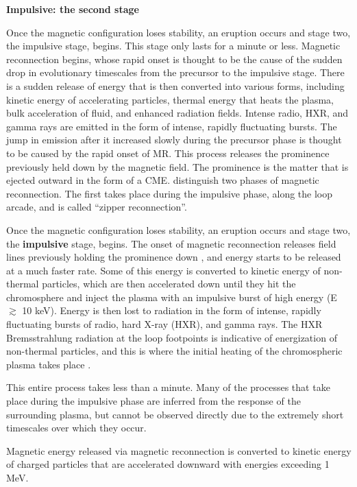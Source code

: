\textbf{Impulsive: the second stage}\quad

Once the magnetic configuration loses stability, an eruption occurs and stage
two, the impulsive stage, begins. This stage only lasts for a minute or less.
Magnetic reconnection begins, whose rapid onset is thought to be the cause of
the sudden drop in evolutionary timescales from the precursor to the impulsive
stage. There is a sudden release of energy that is then converted into various
forms, including kinetic energy of accelerating particles, thermal energy that
heats the plasma, bulk acceleration of fluid, and enhanced radiation fields.
Intense radio, HXR, and gamma rays are emitted in the form of intense, rapidly
fluctuating bursts. The jump in emission after it increased slowly during the
precursor phase is thought to be caused by the rapid onset of MR. This process
releases the prominence previously held down by the magnetic field. The
prominence is the matter that is ejected outward in the form of a CME.
\cite{Priest2017}
distinguish two phases of magnetic reconnection. The first
takes place during the impulsive phase, along the loop arcade, and is called
``zipper reconnection''.

Once the magnetic configuration loses stability, an eruption occurs
and stage two, the \textbf{impulsive} stage, begins. The onset of
magnetic reconnection releases field lines previously holding the
prominence down \citep{Priest2017}, and energy starts to be released
at a much faster rate.
Some of this energy is converted to kinetic energy of
non-thermal particles, which are then accelerated down until they hit the
chromosphere and inject the plasma with an impulsive burst of high energy
(E $\gtrsim$ 10 keV).
Energy is then lost to radiation in the form of
intense, rapidly fluctuating bursts of radio, hard X-ray (HXR),
and gamma rays.
The HXR Bremsstrahlung radiation at the loop footpoints is indicative
of energization of non-thermal particles, and this is
where the initial heating of the chromospheric plasma takes place
\citep{Hoyng1981, Fletcher2013b}.

This entire process takes less than a minute.
Many of the processes that take place during the impulsive phase
are inferred from the response of the surrounding plasma,
but cannot be observed directly due to the extremely short timescales
over which they occur.

Magnetic energy released via magnetic reconnection is converted to
kinetic energy of charged particles that are accelerated downward
with energies exceeding 1 MeV.

